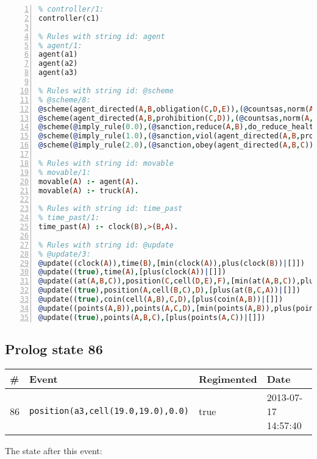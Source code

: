 \documentclass[11pt]{article}\usepackage[utf8]{inputenc}\usepackage{geometry}
\begin{document}
\begin{lstlisting}[language=Prolog, numbers=left]
% Rules with string id: controller
% controller/1:
controller(c1)

% Rules with string id: agent
% agent/1:
agent(a1)
agent(a2)
agent(a3)

% Rules with string id: @scheme
% @scheme/8:
@scheme(agent_directed(A,B,obligation(C,D,E)),(@countsas,norm(A,B,F,obligation(C,D,E)),F),false,(listTrue(C)),(time_past(D)),false,[plus(viol(agent_directed(A,B,obligation(C,D,E))))|[]],[plus(obey(agent_directed(A,B,obligation(C,D,E))))|[]])
@scheme(agent_directed(A,B,prohibition(C,D)),(@countsas,norm(A,B,E,prohibition(C,D)),E),(listTrue(C)),false,(false),false,[plus(viol(agent_directed(A,B,prohibition(C,D))))|[]],[plus(obey(agent_directed(A,B,prohibition(C,D))))|[]])
@scheme(@imply_rule(0.0),(@sanction,reduce(A,B),do_reduce_health(A,B),notifyAgent(A,changed(status))),true,false,false,false,[min(reduce(A,B))|[]],[])
@scheme(@imply_rule(1.0),(@sanction,viol(agent_directed(A,B,prohibition(C,D))),do_sanction(D)),true,false,false,false,[min(viol(agent_directed(A,B,prohibition(C,D))))|[]],[])
@scheme(@imply_rule(2.0),(@sanction,obey(agent_directed(A,B,C))),true,false,false,false,[min(obey(agent_directed(A,B,C)))|[]],[])

% Rules with string id: movable
% movable/1:
movable(A) :- agent(A).
movable(A) :- truck(A).

% Rules with string id: time_past
% time_past/1:
time_past(A) :- clock(B),>(B,A).

% Rules with string id: @update
% @update/3:
@update((clock(A)),time(B),[min(clock(A)),plus(clock(B))|[]])
@update((true),time(A),[plus(clock(A))|[]])
@update((at(A,B,C)),position(C,cell(D,E),F),[min(at(A,B,C)),plus(at(D,E,C))|[]])
@update((true),position(A,cell(B,C),D),[plus(at(B,C,A))|[]])
@update((true),coin(cell(A,B),C,D),[plus(coin(A,B))|[]])
@update((points(A,B)),points(A,C,D),[min(points(A,B)),plus(points(A,D))|[]])
@update((true),points(A,B,C),[plus(points(A,C))|[]])

\end{lstlisting}
\clearpage 
\subsection{Prolog state 86}
\begin{table}[ht]
\centering 
\begin{tabular}{l l l l} 
\textbf{\#} & \textbf{Event} & \textbf{Regimented} & \textbf{Date} \\ [0.5ex] 
\hline
86&\texttt{position(a3,cell(19.0,19.0),0.0)}&true&2013-07-17 14:57:40\\ [1ex] \hline\end{tabular}
\end{table}
The state after this event:
\end{document}
